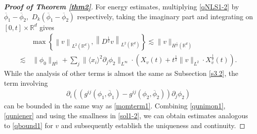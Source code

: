 \documentclass[10pt,twoside,a4paper]{article}
\numberwithin{equation}{section}\allowdisplaybreaks
\begin{document}
\begin{proof}[\textbf{Proof of Theorem \ref{thm2}}]
 	For energy estimates, multiplying \eqref{qNLS1-2} by $ \overline{\phi}_1-\overline{\phi}_2, $ $ D_k(\overline{\phi}_1-\overline{\phi}_2)  $ respectively,  taking the imaginary part and  integrating on $[0,t]\times \mathbb{R}^d $ gives
 	\begin{align} \label{quniener}
 		&\max \left\{\left\|   v\right\|_{L^2(\mathbb{R}^d)}, \left\|   D^{\frac 12} v\right\|_{L^{ 2}(\mathbb{R}^d)}\right\}  	\lesssim	 \|v\|_{H^{ \frac 12}(\mathbb{R}^{d})}\\
 		\lesssim &\,  \|\phi_0\|_{H^{\frac12}}+ \sum_j \| \langle x_i \rangle^2  \partial_j \phi_2\|_{L^\infty} \cdot (	X_v(t)+ t^{\frac12} \|v\|_{L^2}\cdot	X_v^{\frac12} (t) ).\nonumber
 	\end{align}
 	While the analysis of other terms is  almost the same as Subsection  \ref{s3.2}, the term involving
 	\begin{align*} 
 		\partial_i\left( (g^{ij}\left(\phi_1,\overline{\phi}_1\right)-g^{ij}\left(\phi_2,\overline{\phi}_2\right)) \partial_j\phi_2\right)
 	\end{align*}
 	can be bounded in the same way as \eqref{momterm1}. 
 	Combining  \eqref{qunimon1}, \eqref{quniener} and using the smallness in \eqref{sol1-2}, we can obtain estimates analogous to \eqref{qbound1} for  $ v $ and subsequently establish the uniqueness and continuity.  	
\end{proof}
\end{document}
